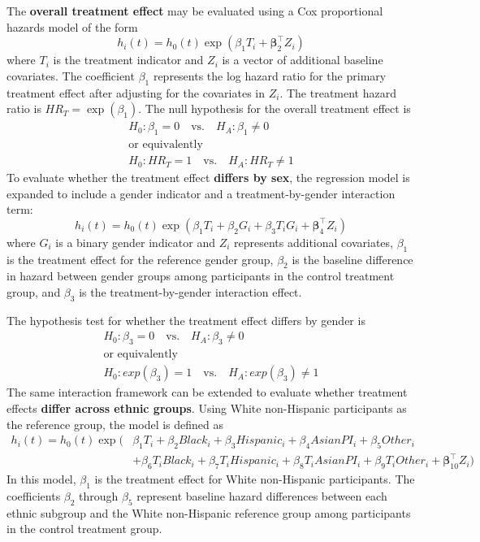 \documentclass[
  letterpaper,
  DIV=11,
  numbers=noendperiod]{scrartcl}
\begin{document}
The \textbf{overall treatment effect} may be evaluated using a Cox
proportional hazards model of the form \[
h_i(t) =
h_0(t)\exp\left(
\beta_1 T_i
+ \boldsymbol{\beta}_2^{\top}Z_i
\right)
\] where \(T_i\) is the treatment indicator and \(Z_i\) is a vector of
additional baseline covariates. The coefficient \(\beta_1\) represents
the log hazard ratio for the primary treatment effect after adjusting
for the covariates in \(Z_i\). The treatment hazard ratio is
\(HR_T = \exp(\beta_1)\). The null hypothesis for the overall treatment
effect is \[
\begin{gathered}
H_0 : \beta_1 = 0 \quad \text{vs.} \quad H_A : \beta_1 \neq 0 \\
\text{or equivalently} \\
H_0 : HR_T = 1 \quad \text{vs.} \quad H_A : HR_T \neq 1
\end{gathered}
\] To evaluate whether the treatment effect \textbf{differs by sex}, the
regression model is expanded to include a gender indicator and a
treatment-by-gender interaction term: \[
h_i(t) =
h_0(t)\exp\left(
\beta_1 T_i
+ \beta_2 G_i
+ \beta_3 T_iG_i
+ \boldsymbol{\beta}_4^{\top}Z_i
\right)
\] where \(G_i\) is a binary gender indicator and \(Z_i\) represents
additional covariates, \(\beta_1\) is the treatment effect for the
reference gender group, \(\beta_2\) is the baseline difference in hazard
between gender groups among participants in the control treatment group,
and \(\beta_3\) is the treatment-by-gender interaction effect.

The hypothesis test for whether the treatment effect differs by gender
is \[
\begin{gathered}
H_0 : \beta_3 = 0 \quad \text{vs.} \quad H_A : \beta_3 \neq 0 \\
\text{or equivalently} \\
H_0 : exp(\beta_3) = 1 \quad \text{vs.} \quad H_A : exp(\beta_3) \neq 1
\end{gathered}
\] The same interaction framework can be extended to evaluate whether
treatment effects \textbf{differ across ethnic groups}. Using White
non-Hispanic participants as the reference group, the model is defined
as \[
\begin{aligned}
h_i(t) = h_0(t)\exp\big(&
\beta_1 T_i
+ \beta_2 Black_i
+ \beta_3 Hispanic_i
+ \beta_4 AsianPI_i
+ \beta_5 Other_i \\
&+ \beta_6 T_i Black_i
+ \beta_7 T_i Hispanic_i
+ \beta_8 T_i AsianPI_i
+ \beta_9 T_i Other_i
+ \boldsymbol{\beta}_{10}^{\top} Z_i
\big)
\end{aligned}
\] In this model, \(\beta_1\) is the treatment effect for White
non-Hispanic participants. The coefficients \(\beta_2\) through
\(\beta_5\) represent baseline hazard differences between each ethnic
subgroup and the White non-Hispanic reference group among participants
in the control treatment group.
\end{document}
